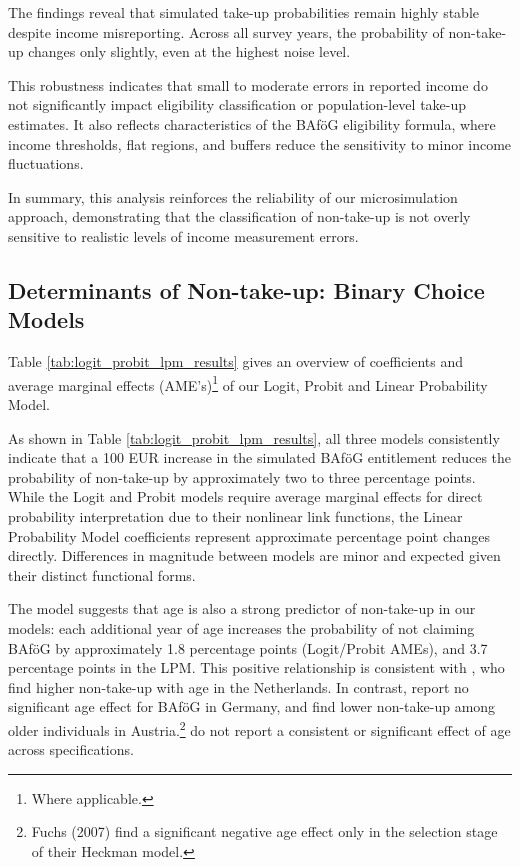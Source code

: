 

The findings reveal that simulated take-up probabilities remain highly stable despite income misreporting. 
Across all survey years, the probability of non-take-up changes only slightly, even at the highest noise level. 

This robustness indicates that small to moderate errors in reported income do not significantly impact eligibility classification or population-level take-up estimates. 
It also reflects characteristics of the BAföG eligibility formula, where income thresholds, flat regions, and buffers reduce the sensitivity to minor income fluctuations.

In summary, this analysis reinforces the reliability of our microsimulation approach, demonstrating that the classification of non-take-up is not overly sensitive to realistic levels of income measurement errors.



\subsection{Determinants of Non-take-up: Binary Choice Models}
Table \ref{tab:logit_probit_lpm_results} gives an overview of coefficients and average marginal effects (AME's)\footnote{Where applicable.} of our Logit, Probit and Linear Probability Model.


As shown in Table \ref{tab:logit_probit_lpm_results}, all three models consistently indicate that a 100 EUR increase in the simulated BAföG entitlement reduces the probability of non-take-up by approximately two to three percentage points. 
While the Logit and Probit models require average marginal effects for direct probability interpretation due to their nonlinear link functions, the Linear Probability Model coefficients represent approximate percentage point changes directly. 
Differences in magnitude between models are minor and expected given their distinct functional forms.




The model suggests that age is also a strong predictor of non-take-up in our models: each additional year of age increases the probability of not claiming BAföG by approximately 1.8 percentage points (Logit/Probit AMEs), and 3.7 percentage points in the LPM. 
This positive relationship is consistent with \cite{konijn_quantifying_2023}, who find higher non-take-up with age in the Netherlands. 
In contrast, \cite{herber_non-take-up_2019} report no significant age effect for BAföG in Germany, and \cite{fuchs_austria_2007} find lower non-take-up among older individuals in Austria.\footnote{Fuchs (2007) find a significant negative age effect only in the selection stage of their Heckman model.}
\cite{frick_claim_2007} do not report a consistent or significant effect of age across specifications.

